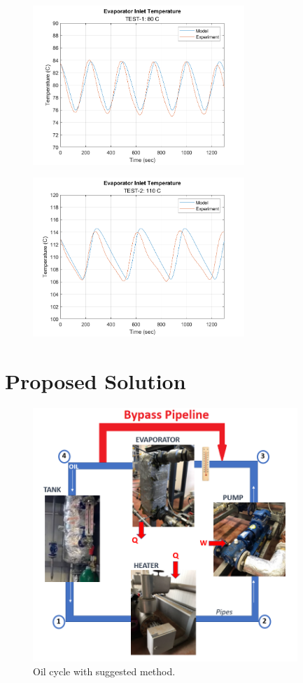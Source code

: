 \begin{figure}[h]
    \begin{minipage}{.5\textwidth}
        \centering
        \includegraphics[width=8cm]{images/TEST-1.png}
        \label{fig:test1}
    \end{minipage}
    \begin{minipage}{.4\textwidth}
        \centering
        \includegraphics[width=8cm]{images/TEST-2.png}
        \label{fig:test2}
    \end{minipage}
\end{figure}


\section{Proposed Solution}

\begin{figure}[H]
    \centering
    \includegraphics[width=10cm]{images/cycle_v2.png}
    \caption{Oil cycle with suggested method.}
    \label{fig:cycle_v2}
\end{figure}

